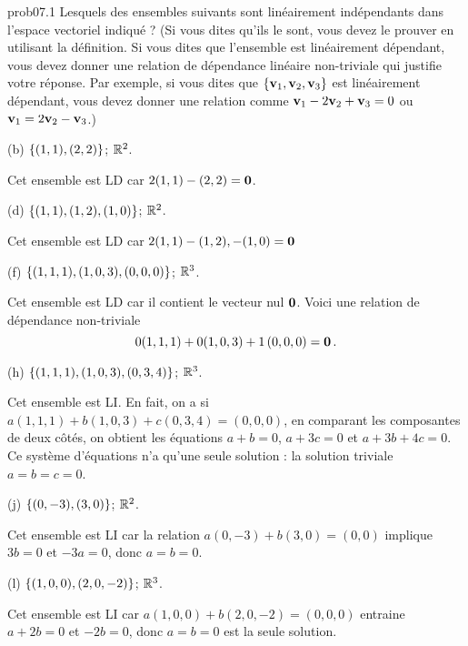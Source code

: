 
\begin{sol}{prob07.1}  Lesquels des ensembles suivants sont linéairement indépendants dans l'espace vectoriel indiqué ? (Si vous dites qu'ils le sont, vous devez le prouver en utilisant la définition. Si vous dites que l'ensemble est linéairement dépendant, vous devez donner une relation de dépendance linéaire non-triviale qui justifie votre réponse. Par exemple, si vous dites que $\{\mathbf{v}_1, \mathbf{v}_2, \mathbf{v}_3\}$ est linéairement dépendant, vous devez donner une relation comme  $\mathbf{v}_1-2 \mathbf{v}_2 +\mathbf{v}_3=0$ ou $\mathbf{v}_1=2 \mathbf{v}_2 -\mathbf{v}_3$.)

\medskip

(b) $\{(1,1), (2, 2)\}$; $\mathbb{R}^2$.

\soln Cet ensemble est LD car $2(1,1)-(2,2)=\mathbf{0}$.
\medskip
 


(d) $\{(1,1), (1, 2), (1,0)\}$; $\mathbb{R}^2$.

\soln Cet ensemble est LD car $2(1,1)- (1, 2), -(1,0)=\mathbf{0}$
\medskip
 

(f) $\{(1,1,1), (1,0,3), (0,0,0)\}$; $\mathbb{R}^3$.

\soln Cet ensemble est LD car il contient le vecteur nul $\mathbf{0}$. Voici une relation de d\'ependance non-triviale $$0(1,1,1)+ 0(1,0,3) +1\, (0,0,0)=\mathbf{0}\,.$$

(h) $\{(1,1,1), (1,0,3), (0,3,4)\}$; $\mathbb{R}^3$.

\soln Cet ensemble est LI. En fait, on a si $a(1,1,1)+b(1,0,3)+c (0,3,4)=(0,0,0)$, en comparant les composantes de deux côtés, on obtient les équations $a+b=0$, $a+3c=0$ et $a +3b+4c=0$. Ce système d'équations n'a qu'une seule solution : la solution triviale $a=b=c=0$. 
\medskip 

(j) $\{(0,-3), (3, 0)\}$; $\mathbb{R}^2$.

\soln Cet ensemble est LI car la relation $a(0,-3) + b(3, 0)=(0,0)$ implique $3b=0$ et $-3a=0$, donc $a=b=0$.
\medskip
 

(l) $\{(1,0,0), (2,0,-2)\}$; $\mathbb{R}^3$.

\soln Cet ensemble est LI car $a(1,0,0)+b (2,0,-2)=(0,0,0)$ entraine $a+2b=0$ et $-2b=0$, donc $a=b=0$ est la seule solution.
\medskip



\end{sol}

